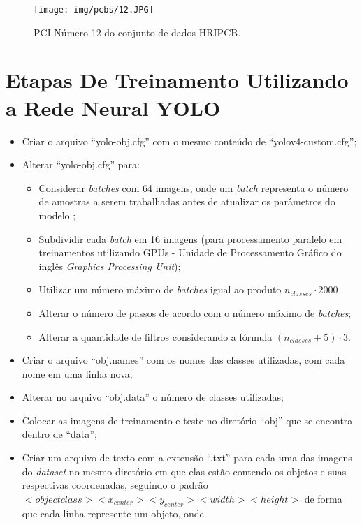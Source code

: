 \begin{figure}[!h] %
  \centering
  \caption{PCI Número 12 do conjunto de dados HRIPCB.}
  \texttt{[image: img/pcbs/12.JPG]}
  \label{fig:ap-pcbs-12}
\end{figure}

\chapter{Etapas De Treinamento Utilizando a Rede Neural YOLO } \label{apendice:etapas-yolo}
\begin{itemize}
  \item Criar o arquivo ``yolo-obj.cfg'' com o mesmo conteúdo de ``yolov4-custom.cfg'';
  \item Alterar ``yolo-obj.cfg'' para:
  \begin{itemize}
    \item Considerar \textit{batches} com 64 imagens, onde um \textit{batch} representa o número de amostras a serem trabalhadas antes de atualizar os parâmetros do modelo \cite{ref:Brownlee};
    \item Subdividir cada \textit{batch} em 16 imagens (para processamento paralelo em treinamentos utilizando GPUs - Unidade de Processamento Gráfico do inglês \textit{Graphics Processing Unit});
    \item Utilizar um número máximo de \textit{batches} igual ao produto $n_{classes} \cdot 2000$
    \item Alterar o número de passos de acordo com o número máximo de \textit{batches};
    \item Alterar a quantidade de filtros considerando a fórmula $(n_{classes} + 5) \cdot 3$.
  \end{itemize}
  \item Criar o arquivo ``obj.names'' com os nomes das classes utilizadas, com cada nome em uma linha nova;
  \item Alterar no arquivo ``obj.data'' o número de classes utilizadas;
  \item Colocar as imagens de treinamento e teste no diretório ``obj'' que se encontra dentro de ``data'';
  \item Criar um arquivo de texto com a extensão ``.txt'' para cada uma das imagens do \textit{dataset} no mesmo diretório em que elas estão contendo os objetos e suas respectivas coordenadas, seguindo o padrão  $<objectclass> <x_{center}> <y_{center}> <width> <height>$ de forma que cada linha represente um objeto, onde

\end{itemize}
